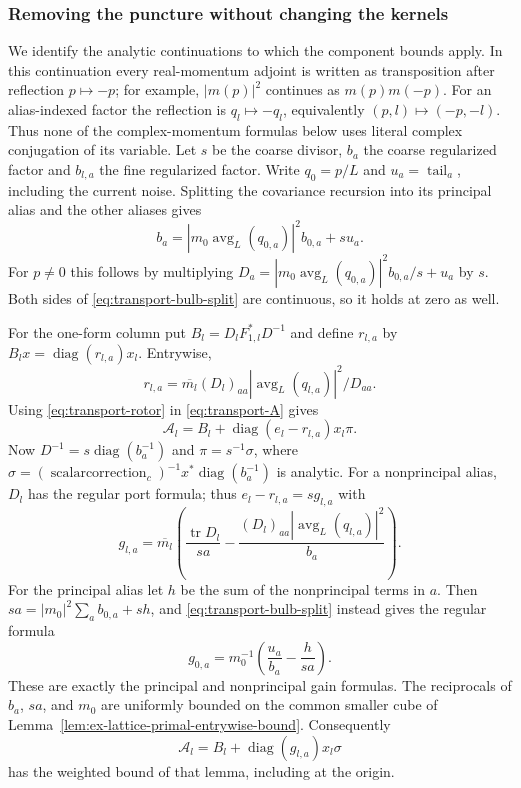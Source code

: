 \subsubsection{Removing the puncture without changing the kernels}
We identify the analytic continuations to which the component bounds apply. In this continuation every real-momentum
adjoint is written as transposition after reflection $p\mapsto-p$;
for example, $|m(p)|^2$ continues as $m(p)m(-p)$.
For an alias-indexed factor the reflection is $q_l\mapsto-q_l$,
equivalently $(p,l)\mapsto(-p,-l)$.
Thus none of the complex-momentum formulas below uses literal
complex conjugation of its variable. Let $s$ be the coarse divisor, $b_a$ the
coarse regularized factor and $b_{l,a}$ the fine regularized factor. Write $q_0=p/L$ and
$u_a=\operatorname{tail}_a$, including the current noise. Splitting
the covariance recursion into its principal alias and the other
aliases gives
\begin{equation}\label{eq:transport-bulb-split}
 b_a=|m_0\operatorname{avg}_L(q_{0,a})|^2b_{0,a}+su_a.
\end{equation}
For $p\ne0$ this follows by multiplying
$D_a=|m_0\operatorname{avg}_L(q_{0,a})|^2b_{0,a}/s+u_a$
by $s$. Both sides of \eqref{eq:transport-bulb-split} are
continuous, so it holds at zero as well.

For the one-form column put $B_l=D_lF_{1,l}^*D^{-1}$ and
define $r_{l,a}$ by $B_lx=\operatorname{diag}(r_{l,a})x_l$.
Entrywise,
\[
 r_{l,a}=\overline{m_l}(D_l)_{aa}
        |\operatorname{avg}_L(q_{l,a})|^2/D_{aa}.
\]
Using \eqref{eq:transport-rotor} in \eqref{eq:transport-A} gives
\[
 \mathcal A_l=B_l+
                 \operatorname{diag}(e_l-r_{l,a})x_l\pi.
\]
Now $D^{-1}=s\operatorname{diag}(b_a^{-1})$ and
$\pi=s^{-1}\sigma$, where
$\sigma=(\operatorname{scalar correction}_c)^{-1}
 x^*\operatorname{diag}(b_a^{-1})$ is analytic.
For a nonprincipal alias, $D_l$ has the regular port formula;
thus $e_l-r_{l,a}=s g_{l,a}$ with
\[
 g_{l,a}=\overline{m_l}
 \left(\frac{\operatorname{tr}D_l}{sa}
             -\frac{(D_l)_{aa}|\operatorname{avg}_L(q_{l,a})|^2}{b_a}
 \right).
\]
For the principal alias let $h$ be the sum of the nonprincipal
terms in $a$. Then $sa=|m_0|^2\sum_a b_{0,a}+sh$, and
\eqref{eq:transport-bulb-split} instead gives the regular formula
\[
       g_{0,a}=m_0^{-1}\left(\frac{u_a}{b_a}-\frac{h}{sa}\right).
\]
These are exactly the principal and nonprincipal gain formulas.
The reciprocals of $b_a$, $sa$, and $m_0$ are uniformly bounded on
the common smaller cube of Lemma~\ref{lem:ex-lattice-primal-entrywise-bound}. Consequently
\[
                \mathcal A_l=B_l+
                              \operatorname{diag}(g_{l,a})x_l\sigma
\]
has the weighted bound of that lemma, including at the origin.

